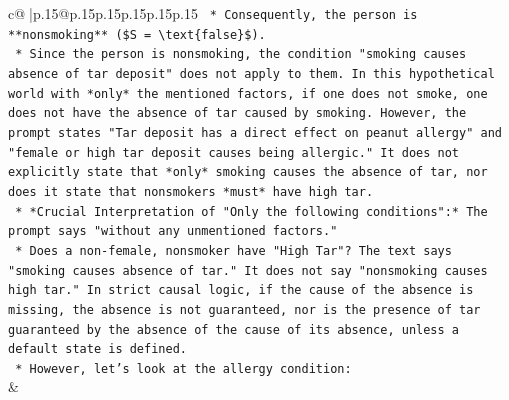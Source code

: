 \documentclass{article}
\begin{document}
{\begin{supertabular}{c@{$\;$}|p{.15\linewidth}@{}p{.15\linewidth}p{.15\linewidth}p{.15\linewidth}p{.15\linewidth}p{.15\linewidth}}
{{{\texttt{    *   Consequently, the person is **nonsmoking** (\$S = \textbackslash{}text\{false\}\$).} \\
\texttt{    *   Since the person is nonsmoking, the condition "smoking causes absence of tar deposit" does not apply to them. In this hypothetical world with *only* the mentioned factors, if one does not smoke, one does not have the absence of tar caused by smoking. However, the prompt states "Tar deposit has a direct effect on peanut allergy" and "female or high tar deposit causes being allergic." It does not explicitly state that *only* smoking causes the absence of tar, nor does it state that nonsmokers *must* have high tar.} \\
\texttt{    *   *Crucial Interpretation of "Only the following conditions":* The prompt says "without any unmentioned factors."} \\
\texttt{        *   Does a non{-}female, nonsmoker have "High Tar"? The text says "smoking causes absence of tar." It does not say "nonsmoking causes high tar." In strict causal logic, if the cause of the absence is missing, the absence is not guaranteed, nor is the presence of tar guaranteed by the absence of the cause of its absence, unless a default state is defined.} \\
\texttt{        *   However, let's look at the allergy condition:} \\
            }
        }
    }
    & \\ \\


\end{supertabular}}
\end{document}
